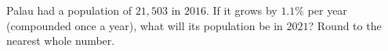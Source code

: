 Palau had a population of $21{,}503$ in $2016$. If it grows by $1.1\%$ per year (compounded once a year), what will its population be in $2021$? Round to the nearest whole number.
